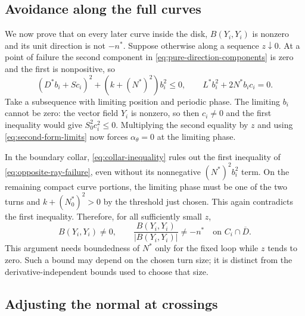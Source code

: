 \subsection{Avoidance along the full curves}

We now prove that on every later curve inside the disk,
$B(Y_i,Y_i)$ is nonzero and its unit direction is not $-n^*$.
Suppose otherwise along a sequence $z\downarrow0$.
At a point of failure the second component in
\eqref{eq:pure-direction-components} is zero and the first is
nonpositive, so
\begin{equation}
 (D^*b_i+Sc_i)^2+(k+(N^*)^2)b_i^2\le0,
 \qquad L^*b_i^2+2N^*b_ic_i=0.
 \label{eq:opposite-ray-failure}
\end{equation}
Take a subsequence with limiting position and periodic phase.
The limiting $b_i$ cannot be zero: the vector field $Y_i$ is nonzero,
so then $c_i\ne0$ and the first inequality would give
$S_0^2c_i^2\le0$.  Multiplying the second equality by $z$ and using
\eqref{eq:second-form-limits} now forces
$\alpha_\theta=0$ at the limiting phase.

In the boundary collar, \eqref{eq:collar-inequality} rules out the
first inequality of \eqref{eq:opposite-ray-failure}, even without its
nonnegative $(N^*)^2b_i^2$ term.  On the remaining compact curve portions,
the limiting phase must be one of the two turns and
$k+(N_0^*)^2>0$ by the threshold just chosen.  This again contradicts
the first inequality.  Therefore, for all sufficiently small $z$,
\begin{equation}
 B(Y_i,Y_i)\ne0,
 \qquad \frac{B(Y_i,Y_i)}{|B(Y_i,Y_i)|}\ne-n^*
 \quad\text{on }C_i\cap\overline D.
 \label{eq:disk-ray-avoidance}
\end{equation}
This argument needs boundedness of $N^*$ only for the fixed loop while
$z$ tends to zero.  Such a bound may depend on the chosen turn size;
it is distinct from the derivative-independent bounds used to choose
that size.

\subsection{Adjusting the normal at crossings}

